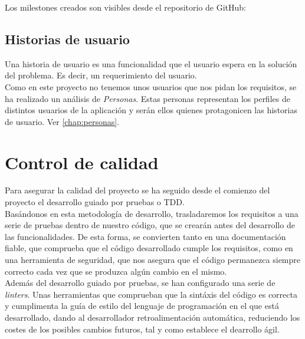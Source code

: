 Los milestones creados son visibles desde el repositorio de GitHub:

\subsection{Historias de usuario}
Una historia de usuario es una funcionalidad que el usuario espera en la solución del problema. Es decir, un
requerimiento del usuario.\\


Como en este proyecto no tenemos unos usuarios que nos pidan los requisitos, se ha realizado un análisis de
\textit{Personas}\cite{personas}. Estas personas representan los perfiles de distintos usuarios de la aplicación y
serán ellos quienes protagonicen las historias de usuario. Ver \autoref{chap:personas}.\\

\section{Control de calidad}\label{sec:control_de_calidad}
Para asegurar la calidad del proyecto se ha seguido desde el comienzo del proyecto el desarrollo guiado por pruebas o
TDD\cite{TDD}.\\

Basándonos en esta metodología de desarrollo, trasladaremos los requisitos a una serie de pruebas dentro de nuestro
código, que se crearán antes del desarrollo de las funcionalidades. De esta forma, se convierten tanto en una
documentación fiable, que comprueba que el código desarrollado cumple los requisitos, como en una herramienta de
seguridad, que nos asegura que el código permanezca siempre correcto cada vez que se produzca algún cambio en el
mismo.\\

Además del desarrollo guiado por pruebas, se han configurado una serie de \textit{linters}. Unas herramientas que
comprueban que la sintáxis del código es correcta y cumplimenta la guía de estilo del lenguaje de programación en el
que está desarrollado, dando al desarrollador retroalimentación automática, reduciendo los costes de los posibles
cambios futuros, tal y como establece el dearrollo ágil.\\

